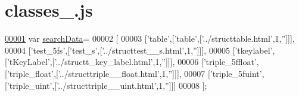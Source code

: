 \hypertarget{classes__8_8js_source}{}\section{classes\+\_.\+js}
\label{classes__8_8js_source}

\begin{DoxyCode}
\hypertarget{classes__8_8js_source.tex_l00001}{}\hyperlink{classes__8_8js_ad01a7523f103d6242ef9b0451861231e}{00001} var \hyperlink{classes__8_8js_ad01a7523f103d6242ef9b0451861231e}{searchData}=
00002 [
00003   [\textcolor{stringliteral}{'table'},[\textcolor{stringliteral}{'table'},[\textcolor{stringliteral}{'../structtable.html'},1,\textcolor{stringliteral}{''}]]],
00004   [\textcolor{stringliteral}{'test\_5fs'},[\textcolor{stringliteral}{'test\_s'},[\textcolor{stringliteral}{'../structtest\_\_s.html'},1,\textcolor{stringliteral}{''}]]],
00005   [\textcolor{stringliteral}{'tkeylabel'},[\textcolor{stringliteral}{'tKeyLabel'},[\textcolor{stringliteral}{'../structt\_key\_label.html'},1,\textcolor{stringliteral}{''}]]],
00006   [\textcolor{stringliteral}{'triple\_5ffloat'},[\textcolor{stringliteral}{'triple\_float'},[\textcolor{stringliteral}{'../structtriple\_\_float.html'},1,\textcolor{stringliteral}{''}]]],
00007   [\textcolor{stringliteral}{'triple\_5fuint'},[\textcolor{stringliteral}{'triple\_uint'},[\textcolor{stringliteral}{'../structtriple\_\_uint.html'},1,\textcolor{stringliteral}{''}]]]
00008 ];
\end{DoxyCode}
